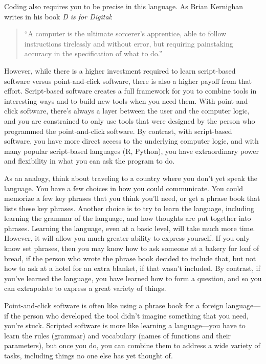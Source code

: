 \documentclass[]{tufte-book}
\begin{document}
Coding also requires you to be precise in this language. As Brian Kernighan
writes in his book \emph{D is for Digital}:

\begin{quote}
``A computer is the ultimate sorcerer's apprentice, able to follow instructions
tirelessly and without error, but requiring painstaking accuracy in the
specification of what to do.'' \citep{kernighan2011d}
\end{quote}

However, while there is a higher investment required to learn script-based
software versus point-and-click software, there is also a higher payoff from
that effort. Script-based software creates a full framework for you to
combine tools in interesting ways and to build new tools when you need them.
With point-and-click software, there's always a layer between the user and
the computer logic, and you are constrained to only use tools that were
designed by the person who programmed the point-and-click software. By
contrast, with script-based software, you have more direct access to the
underlying computer logic, and with many popular script-based languages
(R, Python), you have extraordinary power and flexibility in what you can
ask the program to do.

As an analogy, think about traveling to a country where you don't yet speak the
language. You have a few choices in how you could communicate. You could
memorize a few key phrases that you think you'll need, or get a phrase book that
lists these key phrases. Another choice is to try to learn the language,
including learning the grammar of the language, and how thoughts are put
together into phrases. Learning the language, even at a basic level, will take
much more time. However, it will allow you much greater ability to express
yourself. If you only know set phrases, then you may know how to ask someone at
a bakery for loaf of bread, if the person who wrote the phrase book decided to
include that, but not how to ask at a hotel for an extra blanket, if that wasn't
included. By contrast, if you've learned the language, you have learned how to
form a question, and so you can extrapolate to express a great variety of
things.

Point-and-click software is often like using a phrase book for a foreign
language---if the person who developed the tool didn't imagine something that
you need, you're stuck. Scripted software is more like learning a language---you
have to learn the rules (grammar) and vocabulary (names of functions and
their parameters), but once you do, you can combine them to address a wide
variety of tasks, including things no one else has yet thought of.
\end{document}
